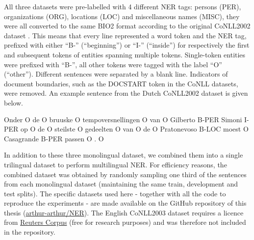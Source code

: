 \documentclass[12pt,a4paper,]{book}
\newenvironment{Shaded}{\begin{snugshade}}{\end{snugshade}}
\newcommand{\BuiltInTok}[1]{#1}
\newcommand{\ExtensionTok}[1]{#1}
\newcommand{\NormalTok}[1]{#1}
\begin{document}
All three datasets were pre-labelled with 4 different NER tags: persons (PER), organizations (ORG), locations (LOC) and miscellaneous names (MISC), they were all converted to the same BIO2 format according to the original CoNLL2002 dataset \citep{tjongkimsang2002}. This means that every line represented a word token and the NER tag, prefixed with either ``B-'' (``beginning'') or ``I-'' (``inside'') for respectively the first and subsequent tokens of entities spanning multiple tokens. Single-token entities were prefixed with ``B-'', all other tokens were tagged with the label ``O'' (``other''). Different sentences were separated by a blank line. Indicators of document boundaries, such as the DOCSTART token in the CoNLL datasets, were removed. An example sentence from the Dutch CoNLL2002 dataset is given below.

\begin{Shaded}
\begin{Highlighting}[]
\ExtensionTok{Onder}\NormalTok{ O}
\ExtensionTok{de}\NormalTok{ O}
\ExtensionTok{bruuske}\NormalTok{ O}
\ExtensionTok{tempoversnellingen}\NormalTok{ O}
\ExtensionTok{van}\NormalTok{ O}
\ExtensionTok{Gilberto}\NormalTok{ B-PER}
\ExtensionTok{Simoni}\NormalTok{ I-PER}
\ExtensionTok{op}\NormalTok{ O}
\ExtensionTok{de}\NormalTok{ O}
\ExtensionTok{steilste}\NormalTok{ O}
\ExtensionTok{gedeelten}\NormalTok{ O}
\ExtensionTok{van}\NormalTok{ O}
\ExtensionTok{de}\NormalTok{ O}
\ExtensionTok{Pratonevoso}\NormalTok{ B-LOC}
\ExtensionTok{moest}\NormalTok{ O}
\ExtensionTok{Casagrande}\NormalTok{ B-PER}
\ExtensionTok{passen}\NormalTok{ O}
\BuiltInTok{.} \ExtensionTok{O}
\end{Highlighting}
\end{Shaded}

In addition to these three monolingual dataset, we combined them into a single trilingual dataset to perform multilingual NER. For efficiency reasons, the combined dataset was obtained by randomly sampling one third of the sentences from each monolingual dataset (maintaining the same train, development and test splits). The specific datasets used here - together with all the code to reproduce the experiments - are made available on the GitHub repository of this thesis (\href{https://github.com/arthur-arthur/NER}{arthur-arthur/NER}). The English CoNLL2003 dataset requires a licence from \href{https://trec.nist.gov/data/reuters/reuters.html}{Reuters Corpus} (free for research purposes) and was therefore not included in the repository.
\end{document}
